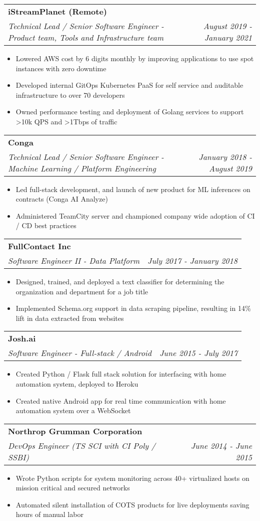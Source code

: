 \documentclass[letterpaper,11pt]{article}
\makeatletter
\newcommand{\resumeItemNoBold}[1]{
  \item\small{
    {#1 \vspace{-2pt}}
  }
}
\newcommand{\resumeSubheading}[3]{
  \vspace{-1pt}\item
    \begin{tabular*}{0.97\textwidth}{l@{\extracolsep{\fill}}r}
      \textbf{#1} \\
      \textit{\small#2} & \textit{\small #3} \\
    \end{tabular*}\vspace{-5pt}
}
\newcommand{\resumeItemListStart}{\begin{itemize}}
\newcommand{\resumeItemListEnd}{\end{itemize}\vspace{-5pt}}
\makeatother
\begin{document}
    \resumeSubheading
      {iStreamPlanet (Remote)}
      {Technical Lead / Senior Software Engineer - Product team, Tools and Infrastructure team}{August 2019 - January 2021}
      \resumeItemListStart
        \resumeItemNoBold {Lowered AWS cost by 6 digits monthly by improving applications to use spot instances with zero downtime}
        \resumeItemNoBold {Developed internal GitOps Kubernetes PaaS for self service and auditable infrastructure to over 70 developers}
        \resumeItemNoBold {Owned performance testing and deployment of Golang services to support \textgreater10k QPS and \textgreater1Tbps of traffic}
      \resumeItemListEnd
    \resumeSubheading
      {Conga}
      {Technical Lead / Senior Software Engineer - Machine Learning / Platform Engineering}{January
        2018 - August 2019}
      \resumeItemListStart
        \resumeItemNoBold {Led full-stack development, and launch of new product for ML inferences on contracts (Conga AI Analyze)}
        \resumeItemNoBold {Administered TeamCity server and championed company wide adoption of CI / CD best practices}
      \resumeItemListEnd

    \resumeSubheading
      {FullContact Inc}
      {Software Engineer II - Data Platform}{July 2017 - January 2018}
      \resumeItemListStart
        \resumeItemNoBold {Designed, trained, and deployed a text classifier for determining the organization and department for a job title}
        \resumeItemNoBold {Implemented Schema.org support in data scraping pipeline, resulting in 14\% lift in data extracted from websites}
      \resumeItemListEnd

    \resumeSubheading
      {Josh.ai}
      {Software Engineer - Full-stack / Android}{June 2015 - July 2017}
      \resumeItemListStart
        \resumeItemNoBold{Created Python / Flask full stack solution for interfacing with home automation system, deployed to Heroku}
        \resumeItemNoBold{Created native Android app for real time communication with home automation system over a WebSocket}
      \resumeItemListEnd

    \resumeSubheading
      {Northrop Grumman Corporation}
      {DevOps Engineer (TS SCI with CI Poly / SSBI)}{June 2014 - June 2015}
      \resumeItemListStart
        \resumeItemNoBold{Wrote Python scripts for system monitoring across 40+ virtualized hosts on mission critical and secured networks}
        \resumeItemNoBold{Automated silent installation of COTS products for live deployments saving hours of manual labor}
      \resumeItemListEnd
\end{document}
